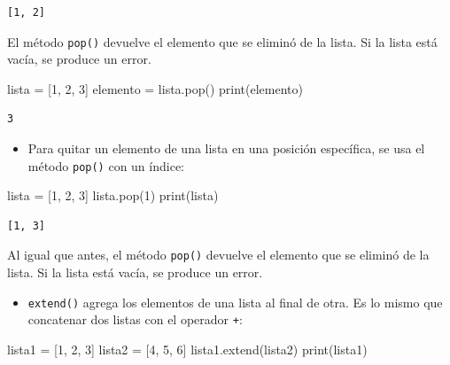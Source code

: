 \documentclass[
  letterpaper,
  DIV=11,
  numbers=noendperiod]{scrreprt}
\newenvironment{Shaded}{\begin{snugshade}}{\end{snugshade}}
\newcommand{\BuiltInTok}[1]{\textcolor[rgb]{0.00,0.23,0.31}{#1}}
\newcommand{\DecValTok}[1]{\textcolor[rgb]{0.68,0.00,0.00}{#1}}
\newcommand{\NormalTok}[1]{\textcolor[rgb]{0.00,0.23,0.31}{#1}}
\newcommand{\OperatorTok}[1]{\textcolor[rgb]{0.37,0.37,0.37}{#1}}
\providecommand{\tightlist}{%
  \setlength{\itemsep}{0pt}\setlength{\parskip}{0pt}}\usepackage{longtable,booktabs,array}
\begin{document}
\begin{verbatim}
[1, 2]
\end{verbatim}

El método \texttt{pop()} devuelve el elemento que se eliminó de la
lista. Si la lista está vacía, se produce un error.

\begin{Shaded}
\begin{Highlighting}[]
\NormalTok{lista }\OperatorTok{=}\NormalTok{ [}\DecValTok{1}\NormalTok{, }\DecValTok{2}\NormalTok{, }\DecValTok{3}\NormalTok{]}
\NormalTok{elemento }\OperatorTok{=}\NormalTok{ lista.pop()}
\BuiltInTok{print}\NormalTok{(elemento)}
\end{Highlighting}
\end{Shaded}

\begin{verbatim}
3
\end{verbatim}

\begin{itemize}
\tightlist
\item
  Para quitar un elemento de una lista en una posición específica, se
  usa el método \texttt{pop()} con un índice:
\end{itemize}

\begin{Shaded}
\begin{Highlighting}[]
\NormalTok{lista }\OperatorTok{=}\NormalTok{ [}\DecValTok{1}\NormalTok{, }\DecValTok{2}\NormalTok{, }\DecValTok{3}\NormalTok{]}
\NormalTok{lista.pop(}\DecValTok{1}\NormalTok{)}
\BuiltInTok{print}\NormalTok{(lista)}
\end{Highlighting}
\end{Shaded}

\begin{verbatim}
[1, 3]
\end{verbatim}

Al igual que antes, el método \texttt{pop()} devuelve el elemento que se
eliminó de la lista. Si la lista está vacía, se produce un error.

\begin{itemize}
\tightlist
\item
  \texttt{extend()} agrega los elementos de una lista al final de otra.
  Es lo mismo que concatenar dos listas con el operador \texttt{+}:
\end{itemize}

\begin{Shaded}
\begin{Highlighting}[]
\NormalTok{lista1 }\OperatorTok{=}\NormalTok{ [}\DecValTok{1}\NormalTok{, }\DecValTok{2}\NormalTok{, }\DecValTok{3}\NormalTok{]}
\NormalTok{lista2 }\OperatorTok{=}\NormalTok{ [}\DecValTok{4}\NormalTok{, }\DecValTok{5}\NormalTok{, }\DecValTok{6}\NormalTok{]}
\NormalTok{lista1.extend(lista2)}
\BuiltInTok{print}\NormalTok{(lista1)}
\end{Highlighting}
\end{Shaded}
\end{document}
